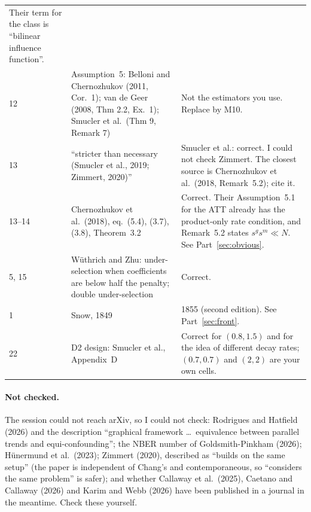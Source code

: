 \documentclass[11pt]{article}
\theoremstyle{plain}
\theoremstyle{remark}
\begin{document}
\begin{center}
\begin{tabular}{p{}p{}p{}}
  Their term for the class is ``bilinear influence function''.\\
12 & Assumption~5: Belloni and Chernozhukov (2011, Cor.~1); van de Geer (2008,
  Thm 2.2, Ex.~1); Smucler et al.\ (Thm 9, Remark 7) & Not the estimators you
  use. Replace by M10.\\
13 & ``stricter than necessary (Smucler et al., 2019; Zimmert, 2020)'' & Smucler
  et al.: correct. I could not check Zimmert. The closest source is
  Chernozhukov et al.\ (2018, Remark~5.2); cite it.\\
13--14 & Chernozhukov et al.\ (2018), eq.~(5.4), (3.7), (3.8), Theorem~3.2 &
  Correct. Their Assumption~5.1 for the ATT already has the product-only rate
  condition, and Remark~5.2 states $s^gs^m\ll N$. See Part~\ref{sec:obvious}.\\
5, 15 & Wüthrich and Zhu: under-selection when coefficients are below half the
  penalty; double under-selection & Correct.\\
1 & Snow, 1849 & 1855 (second edition). See Part~\ref{sec:front}.\\
22 & D2 design: Smucler et al., Appendix~D & Correct for $(0.8,1.5)$ and for the
  idea of different decay rates; $(0.7,0.7)$ and $(2,2)$ are your own cells.\\
\bottomrule
\end{tabular}
\end{center}

\paragraph{Not checked.} The session could not reach arXiv, so I could not
check: Rodrigues and Hatfield (2026) and the description ``graphical framework
\dots\ equivalence between parallel trends and equi-confounding''; the NBER
number of Goldsmith-Pinkham (2026); Hünermund et al.\ (2023); Zimmert (2020),
described as ``builds on the same setup'' (the paper is independent of Chang's
and contemporaneous, so ``considers the same problem'' is safer); and whether
Callaway et al.\ (2025), Caetano and Callaway (2026) and Karim and Webb (2026)
have been published in a journal in the meantime. Check these yourself.
\end{document}
